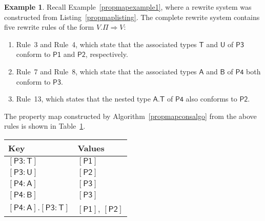 \documentclass[a4paper,headsepline,bibliography=totoc,toc=flat,fleqn,twoside=semi]{scrbook}
\theoremstyle{definition}
\theoremstyle{definition}
\newtheorem{example}{Example}[chapter]
\theoremstyle{definition}
\newcommand{\namesym}[1]{\mathsf{#1}}
\newcommand{\genericparam}[1]{\bm{\mathsf{#1}}}
\newcommand{\proto}[1]{\bm{\mathsf{#1}}}
\newcommand{\protosym}[1]{[\proto{#1}]}
\newcommand{\assocsym}[2]{[\proto{#1}\colon\namesym{#2}]}
\begin{document}
\begin{example}\label{propmapexample2}
Recall Example~\ref{propmapexample1}, where a rewrite system was constructed from Listing~\ref{propmaplisting}. The complete rewrite system contains five rewrite rules of the form $V.\Pi\Rightarrow V$:
\begin{enumerate}
\item Rule~3 and Rule~4, which state that the associated types $\namesym{T}$ and $\namesym{U}$ of $\proto{P3}$ conform to $\proto{P1}$ and $\proto{P2}$, respectively.
\item Rule~7 and Rule~8, which state that the associated types $\namesym{A}$ and $\namesym{B}$ of $\proto{P4}$ both conform to $\proto{P3}$.
\item Rule~13, which states that the nested type $\genericparam{A}.\genericparam{T}$ of $\proto{P4}$ also conforms to $\proto{P2}$.
\end{enumerate}
The property map constructed by Algorithm~\ref{propmapconsalgo} from the above rules is shown in Table~\ref{propmapexample2table}.
\end{example}
\begin{table}\label{propmapexample2table}
\begin{center}
\begin{tabular}{|l|l|}
\hline
Key&Values\\
\hline
\hline
$\assocsym{P3}{T}$&$\protosym{P1}$\\
$\assocsym{P3}{U}$&$\protosym{P2}$\\
$\assocsym{P4}{A}$&$\protosym{P3}$\\
$\assocsym{P4}{B}$&$\protosym{P3}$\\
$\assocsym{P4}{A}.\assocsym{P3}{T}$&$\protosym{P1}$, $\protosym{P2}$\\
\hline
\end{tabular}
\end{center}
\end{table}
\end{document}
